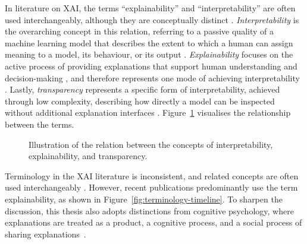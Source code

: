 In literature on \ac{XAI}, the terms \enquote{explainability} and \enquote{interpretability} are often used interchangeably, although they are conceptually distinct \parencite{Arrieta2020}. \textit{Interpretability} is the overarching concept in this relation, referring to a passive quality of a machine learning model that describes the extent to which a human can assign meaning to a model, its behaviour, or its output \parencite{Arrieta2020}. \textit{Explainability} focuses on the active process of providing explanations that support human understanding and decision-making \parencite{Guidotti2018}, and therefore represents one mode of achieving interpretability \parencite{Lipton2018}. Lastly, \textit{transparency} represents a specific form of interpretability, achieved through low complexity, describing how directly a model can be inspected without additional explanation interfaces \parencite{Lipton2018}. Figure~\ref{fig:xai-concept-relations} visualises the relationship between the terms.

\begin{figure}[ht]
    \centering
    \caption[Relation between interpretability, explainability, and transparency]{Illustration of the relation between the concepts of interpretability, explainability, and transparency.}
    \label{fig:xai-concept-relations}
\end{figure}

Terminology in the \ac{XAI} literature is inconsistent, and related concepts are often used interchangeably \parencite{Arrieta2020}. However, recent publications predominantly use the term explainability, as shown in Figure~\ref{fig:terminology-timeline}. To sharpen the discussion, this thesis also adopts distinctions from cognitive psychology, where explanations are treated as a product, a cognitive process, and a social process of sharing explanations~\parencite{Miller2019}.

